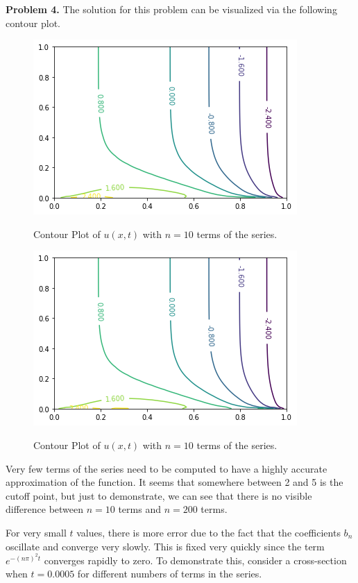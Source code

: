 \documentclass[12pt]{article}
\newcommand{\problem}[1]{\hspace{-4 ex} \large \textbf{Problem #1} }
\begin{document}
\problem{4. } The solution for this problem can be visualized via the following contour plot.

\begin{figure}[H]
	\caption{Contour Plot of $u(x,t)$ with $n=10$ terms of the series.}
	\includegraphics[width=.9\textwidth]{tk01_figure_1_contour_10}
	\label{contour10}
	\centering
\end{figure}
\begin{figure}[H]
	\caption{Contour Plot of $u(x,t)$ with $n=10$ terms of the series.}
	\includegraphics[width=.9\textwidth]{tk01_figure_2_contour_200}
	\label{contour200}
	\centering
\end{figure}

Very few terms of the series need to be computed to have a highly accurate approximation of the function. It seems that somewhere between 2 and 5 is the cutoff point, but just to demonstrate, we can see that there is no visible difference between $n=10$ terms and $n=200$ terms. \bigbreak

For very small $t$ values, there is more error due to the fact that the coefficients $b_n$ oscillate and converge very slowly. This is fixed very quickly since the term $e^{-(n \pi)^2t}$ converges rapidly to zero. To demonstrate this, consider a cross-section when $t=0.0005$ for different numbers of terms in the series.
	
\end{document}
